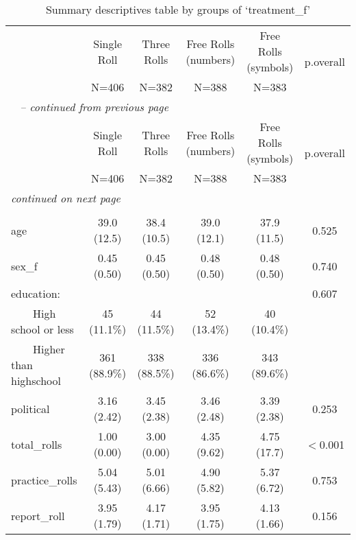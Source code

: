    
    \begin{longtable}{lccccc}\caption{Summary descriptives table by groups of `treatment\_f'}\\
    \hline  
     & Single Roll & Three Rolls & Free Rolls (numbers) & Free Rolls (symbols) & \multirow{2}{*}{p.overall}\\ 
 &    N=406    &    N=382    &        N=388         &        N=383         &           \\ 
  
    \hline
    \hline     
    \endfirsthead 
    \multicolumn{6}{l}{\tablename\ \thetable{} \textit{-- continued from previous page}}\\ 
    \hline
     & Single Roll & Three Rolls & Free Rolls (numbers) & Free Rolls (symbols) & \multirow{2}{*}{p.overall}\\ 
 &    N=406    &    N=382    &        N=388         &        N=383         &           \\ 

    \hline
    \hline  
    \endhead   
    \hline
    \multicolumn{6}{l}{\textit{continued on next page}} \\ 
    \endfoot   
    \multicolumn{6}{l}{}  \\ 
    \endlastfoot 
    age & 39.0 (12.5) & 38.4 (10.5) &     39.0 (12.1)      &     37.9 (11.5)      &   0.525  \\ 
sex\_f & 0.45 (0.50) & 0.45 (0.50) &     0.48 (0.50)      &     0.48 (0.50)      &   0.740  \\ 
education: &             &             &                      &                      &   0.607  \\ 
$\qquad$High school or less & 45 (11.1\%)  & 44 (11.5\%)  &      52 (13.4\%)      &      40 (10.4\%)      &          \\ 
$\qquad$Higher than highschool & 361 (88.9\%) & 338 (88.5\%) &     336 (86.6\%)      &     343 (89.6\%)      &          \\ 
political & 3.16 (2.42) & 3.45 (2.38) &     3.46 (2.48)      &     3.39 (2.38)      &   0.253  \\ 
total\_rolls & 1.00 (0.00) & 3.00 (0.00) &     4.35 (9.62)      &     4.75 (17.7)      &  $<$0.001  \\ 
practice\_rolls & 5.04 (5.43) & 5.01 (6.66) &     4.90 (5.82)      &     5.37 (6.72)      &   0.753  \\ 
report\_roll & 3.95 (1.79) & 4.17 (1.71) &     3.95 (1.75)      &     4.13 (1.66)      &   0.156   \\ 
 
    \hline
    \end{longtable}
